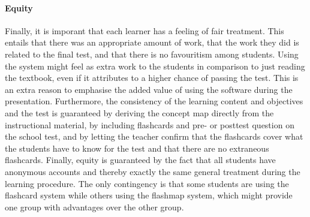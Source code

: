 \paragraph{Equity} Finally, it is imporant that each learner has a feeling of fair treatment. This entails that there was an appropriate amount of work, that the work they did is related to the final test, and that there is no favouritism among students. Using the system might feel as extra work to the students in comparison to just reading the textbook, even if it attributes to a higher chance of passing the test. This is an extra reason to emphasise the added value of using the software during the presentation. Furthermore, the consistency of the learning content and objectives and the test is guaranteed by deriving the concept map directly from the instructional material, by including flashcards and pre- or posttest question on the school test, and by letting the teacher confirm that the flashcards cover what the students have to know for the test and that there are no extraneous flashcards. Finally, equity is guaranteed by the fact that all students have anonymous accounts and thereby exactly the same general treatment during the learning procedure. The only contingency is that some students are using the flashcard system while others using the flashmap system, which might provide one group with advantages over the other group.
